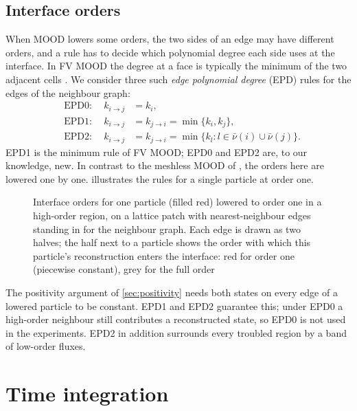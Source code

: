 \documentclass[smallextended]{svjour3}
\numberwithin{equation}{section}
\newcommand{\cnb}{\bar\nu}
\newcommand{\ord}[2]{k_{#1\to #2}}
\begin{document}
\subsection{Interface orders}\label{sec:epd}

When MOOD lowers some orders, the two sides of an edge may have different orders, and a rule has to decide which polynomial degree each side uses at the interface. In FV MOOD the degree at a face is typically the minimum of the two adjacent cells \cite{Clain2011,Diot2012}. We consider three such \emph{edge polynomial degree} (EPD) rules for the edges of the neighbour graph:
\begin{equation}\label{eq:epd}
\begin{aligned}
&\text{EPD0:}&\ \ \ord ij&=k_i,\\
&\text{EPD1:}&\ \ \ord ij&=\ord ji=\min\{k_i,k_j\},\\
&\text{EPD2:}&\ \ \ord ij&=\ord ji=\min\{k_l: l\in\cnb(i)\cup\cnb(j)\}.
\end{aligned}
\end{equation}
EPD1 is the minimum rule of FV MOOD; EPD0 and EPD2 are, to our knowledge, new. In contrast to the meshless MOOD of \cite{Willems2025}, the orders here are lowered one by one.  illustrates the rules for a single particle at order one.

\begin{figure}[!htbp]
\centering

\caption{Interface orders for one particle (filled red) lowered to order one in a high-order region, on a lattice patch with nearest-neighbour edges standing in for the neighbour graph. Each edge is drawn as two halves; the half next to a particle shows the order with which this particle's reconstruction enters the interface: red for order one (piecewise constant), grey for the full order}\label{fig:epd}
\end{figure}

The positivity argument of \cref{sec:positivity} needs both states on every edge of a lowered particle to be constant. EPD1 and EPD2 guarantee this; under EPD0 a high-order neighbour still contributes a reconstructed state, so EPD0 is not used in the experiments. EPD2 in addition surrounds every troubled region by a band of low-order fluxes.

\section{Time integration}\label{sec:time}
\end{document}
